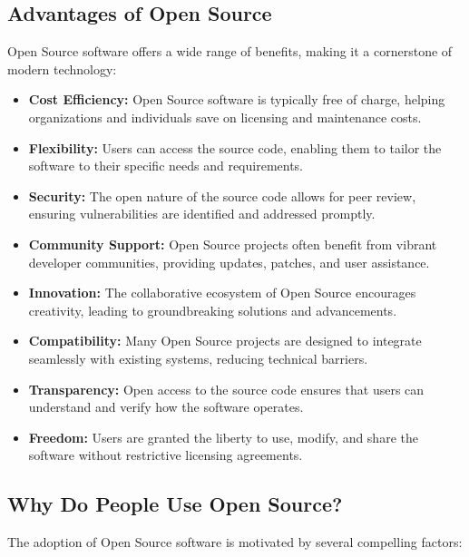 \cite{opensource_what_is}

\subsection{Advantages of Open Source}

Open Source software offers a wide range of benefits, making it a cornerstone of modern technology:

\begin{itemize}
    \item \textbf{Cost Efficiency:} Open Source software is typically free of charge, helping organizations and individuals save on licensing and maintenance costs.
    \item \textbf{Flexibility:} Users can access the source code, enabling them to tailor the software to their specific needs and requirements.
    \item \textbf{Security:} The open nature of the source code allows for peer review, ensuring vulnerabilities are identified and addressed promptly.
    \item \textbf{Community Support:} Open Source projects often benefit from vibrant developer communities, providing updates, patches, and user assistance.
    \item \textbf{Innovation:} The collaborative ecosystem of Open Source encourages creativity, leading to groundbreaking solutions and advancements.
    \item \textbf{Compatibility:} Many Open Source projects are designed to integrate seamlessly with existing systems, reducing technical barriers.
    \item \textbf{Transparency:} Open access to the source code ensures that users can understand and verify how the software operates.
    \item \textbf{Freedom:} Users are granted the liberty to use, modify, and share the software without restrictive licensing agreements.
\end{itemize}

\cite{advantages-of-open-source-software}
\cite{Pros-and-cons-of-open-source-software}

\subsection{Why Do People Use Open Source?}

The adoption of Open Source software is motivated by several compelling factors:

